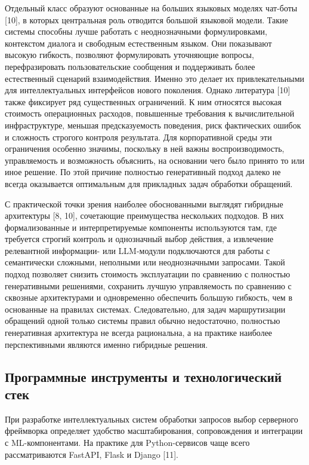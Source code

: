 \documentclass[14pt,a4paper]{extarticle}
\numberwithin{figure}{section}
\numberwithin{table}{section}
\begin{document}
Отдельный класс образуют основанные на больших языковых моделях чат-боты [10], в которых
центральная роль отводится большой языковой модели. Такие системы
способны лучше работать с неоднозначными формулировками, контекстом
диалога и свободным естественным языком. Они показывают высокую
гибкость, позволяют формулировать уточняющие вопросы, перефразировать
пользовательские сообщения и поддерживать более естественный сценарий
взаимодействия. Именно это делает их привлекательными для
интеллектуальных интерфейсов нового поколения. Однако литература
[10] также фиксирует ряд существенных ограничений. К ним относятся
высокая стоимость операционных расходов, повышенные требования к
вычислительной инфраструктуре, меньшая предсказуемость поведения, риск
фактических ошибок и сложность строгого контроля результата. Для
корпоративной среды эти ограничения особенно значимы, поскольку в ней
важны воспроизводимость, управляемость и возможность объяснить, на
основании чего было принято то или иное решение. По этой причине
полностью генеративный подход далеко не всегда оказывается оптимальным
для прикладных задач обработки обращений.

С практической точки зрения наиболее обоснованными выглядят гибридные
архитектуры [8, 10], сочетающие преимущества нескольких подходов. В них
формализованные и интерпретируемые компоненты используются там, где
требуется строгий контроль и однозначный выбор действия, а извлечение релевантной информации-
или LLM-модули подключаются для работы с семантически сложными,
неполными или неоднозначными запросами. Такой подход позволяет снизить
стоимость эксплуатации по сравнению с полностью генеративными решениями,
сохранить лучшую управляемость по сравнению с сквозные архитектурами и
одновременно обеспечить большую гибкость, чем в основанные на правилах системах.
Следовательно, для задач маршрутизации обращений одной только системы
правил обычно недостаточно, полностью генеративная архитектура не всегда
рациональна, а на практике наиболее перспективными являются именно
гибридные решения.

\subsection{Программные инструменты и технологический
стек}

При разработке интеллектуальных систем обработки запросов выбор
серверного фреймворка определяет удобство масштабирования, сопровождения
и интеграции с ML-компонентами. На практике для Python-сервисов чаще
всего рассматриваются FastAPI, Flask и Django [11].
\end{document}
